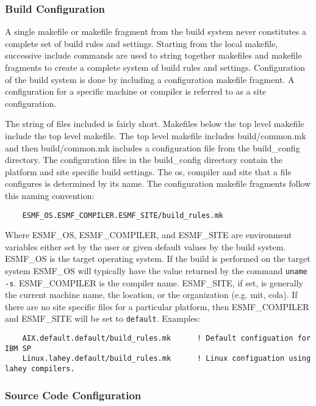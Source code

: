 \subsubsection{Build Configuration}

A single makefile or makefile fragment from the build system never
constitutes a complete set of build rules and settings.  Starting from
the local makefile, successive include commands are used to string
together makefiles and makefile fragments to create a complete system
of build rules and settings.  Configuration of the build system is
done by including a configuration makefile fragment. A configuration for a
specific machine or compiler is referred to as a site configuration.

The string of files included is fairly short.  Makefiles below the top
level makefile include the top level makefile. The top level makefile
includes build/common.mk and then build/common.mk includes a
configuration file from the build\_config directory.  The configuration
files in the build\_config directory contain the platform and site
specific build settings.  The os, compiler and site that a file
configures is determined by its name.  The configuration makefile
fragments follow this naming convention:

\begin{verbatim}
    ESMF_OS.ESMF_COMPILER.ESMF_SITE/build_rules.mk
\end{verbatim}

Where ESMF\_OS, ESMF\_COMPILER, and ESMF\_SITE are environment
variables either set by the user or given default values by the build
system. ESMF\_OS is the target operating system. If the build is performed
on the target system ESMF\_OS will typically have the value returned by the
command {\tt uname -s}. ESMF\_COMPILER is the compiler name. ESMF\_SITE, if set,
is generally the current machine name, the location, or the organization (e.g.
mit, cola).  If there are no site specific files for a particular platform, then
ESMF\_COMPILER and ESMF\_SITE will be set to {\tt default}.  Examples:

\begin{verbatim}
    AIX.default.default/build_rules.mk      ! Default configuation for IBM SP
    Linux.lahey.default/build_rules.mk      ! Linux configuation using lahey compilers.
\end{verbatim}

\subsubsection{Source Code Configuration}

